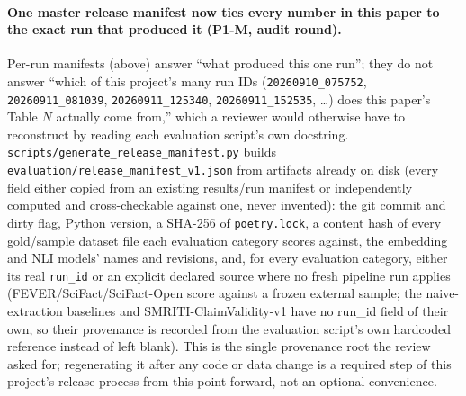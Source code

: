 \paragraph{One master release manifest now ties every number in this
paper to the exact run that produced it (P1-M, audit round).} Per-run
manifests (above) answer ``what produced this one run''; they do not
answer ``which of this project's many run IDs
(\texttt{20260910\_075752}, \texttt{20260911\_081039},
\texttt{20260911\_125340}, \texttt{20260911\_152535}, \ldots) does this
paper's Table $N$ actually come from,'' which a reviewer would otherwise
have to reconstruct by reading each evaluation script's own docstring.
\texttt{scripts/generate\_release\_manifest.py} builds
\texttt{evaluation/release\_manifest\_v1.json} from artifacts already on
disk (every field either copied from an existing results/run manifest
or independently computed and cross-checkable against one, never
invented): the git commit and dirty flag, Python version, a SHA-256 of
\texttt{poetry.lock}, a content hash of every gold/sample dataset file
each evaluation category scores against, the embedding and NLI models'
names and revisions, and, for every evaluation category, either its real
\texttt{run\_id} or an explicit declared source where no fresh pipeline
run applies (FEVER/SciFact/SciFact-Open score against a frozen external
sample; the naive-extraction baselines and SMRITI-ClaimValidity-v1 have
no run\_id field of their own, so their provenance is recorded from the
evaluation script's own hardcoded reference instead of left blank). This
is the single provenance root the review asked for; regenerating it
after any code or data change is a required step of this project's
release process from this point forward, not an optional convenience.
